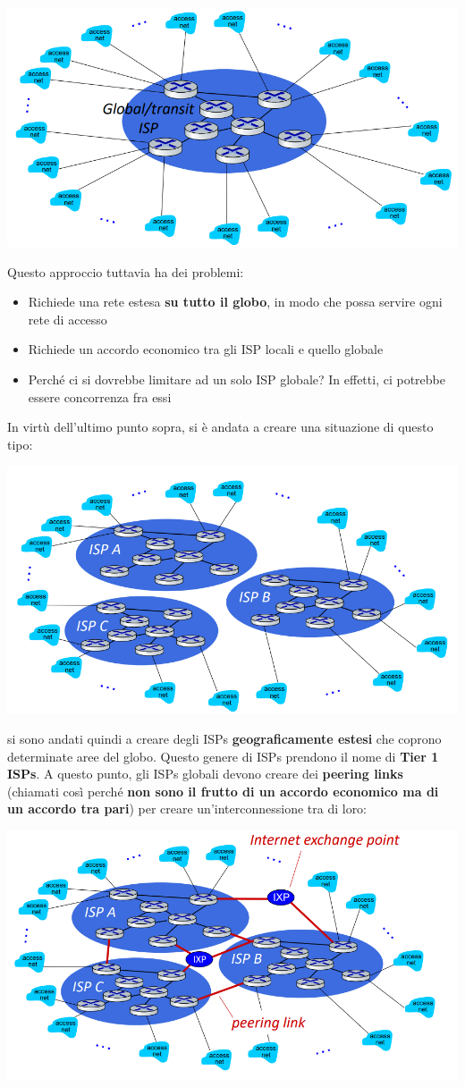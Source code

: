 \documentclass[12pt]{article}
\begin{document}
\begin{center}
    \includegraphics[width =0.85\linewidth]{Images/12.PNG}
\end{center}
Questo approccio tuttavia ha dei problemi:
\begin{itemize}
    \item Richiede una rete estesa \textbf{su tutto il globo}, in modo che possa servire ogni rete di accesso
    \item Richiede un accordo economico tra gli ISP locali e quello globale
    \item Perché ci si dovrebbe limitare ad un solo ISP globale? In effetti, ci potrebbe essere concorrenza fra essi
\end{itemize}
In virtù dell'ultimo punto sopra, si è andata a creare una situazione di questo tipo:
\begin{center}
    \includegraphics[width =0.85\linewidth]{Images/13.PNG}
\end{center}
si sono andati quindi a creare degli ISPs \textbf{geograficamente estesi} che coprono determinate aree del globo.
Questo genere di ISPs prendono il nome di \textbf{Tier 1 ISPs}.
A questo punto, gli ISPs globali devono creare dei \textbf{peering links} (chiamati così perché \textbf{non sono il frutto di un accordo economico ma di un accordo tra pari})
per creare un'interconnessione tra di loro:
\begin{center}
    \includegraphics[width =0.85\linewidth]{Images/14.PNG}
\end{center}
\end{document}
